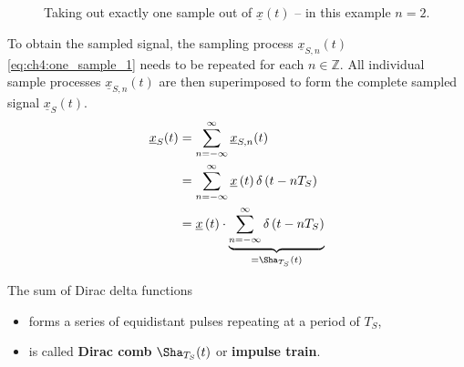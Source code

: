 \begin{refsection}
\begin{figure}[H]
	\centering
	\caption[Taking out exactly one sample out of $\underline{x}(t)$]{Taking out exactly one sample out of $\underline{x}(t)$ -- in this example $n = 2$.}
\end{figure}

To obtain the sampled signal, the sampling process $\underline{x}_{S,n}(t)$ \eqref{eq:ch4:one_sample_1} needs to be repeated for each $n \in \mathbb{Z}$. All individual sample processes $\underline{x}_{S,n}(t)$ are then superimposed to form the complete sampled signal $\underline{x}_S(t)$.
\begin{equation}
	\begin{split}
		\underline{x}_S(t) &= \sum\limits_{n = -\infty}^{\infty} \underline{x}_{S,n}(t) \\
		 &= \sum\limits_{n = -\infty}^{\infty} \underline{x}\left(t\right) \delta\left(t - n T_S\right) \\
		 &= \underline{x}\left(t\right) \cdot \underbrace{\sum\limits_{n = -\infty}^{\infty} \delta\left(t - n T_S\right)}_{= \Sha_{T_S}(t)}
	\end{split}
\end{equation}

The sum of Dirac delta functions
\begin{itemize}
	\item forms a series of equidistant pulses repeating at a period of $T_S$,
	\item is called  \textbf{Dirac comb} $\Sha_{T_S}(t)$ or  \textbf{impulse train}.
\end{itemize}


\end{refsection}

